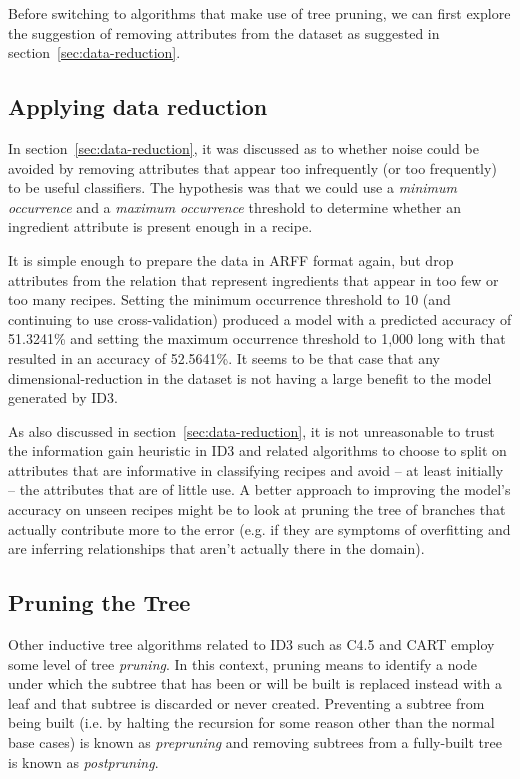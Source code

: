 \documentclass[11pt,a4paper]{article}
\begin{document}
Before switching to algorithms that make use of tree pruning, we can first explore the
suggestion of removing attributes from the dataset as suggested in
section~\ref{sec:data-reduction}.

\subsection{Applying data reduction}

In section~\ref{sec:data-reduction}, it was discussed as to whether noise could be
avoided by removing attributes that appear too infrequently (or too frequently) to be
useful classifiers. The hypothesis was that we could use a \emph{minimum occurrence} and
a \emph{maximum occurrence} threshold to determine whether an ingredient attribute
is present enough in a recipe.

It is simple enough to prepare the data in ARFF format again, but drop attributes from
the relation that represent ingredients that appear in too few or too many recipes.
Setting the minimum occurrence threshold to 10 (and continuing to use cross-validation)
produced a model with a predicted accuracy of 51.3241\% and setting the maximum
occurrence threshold to 1,000 long with that resulted in an accuracy of 52.5641\%. It
seems to be that case that any dimensional-reduction in the dataset is not having a
large benefit to the model generated by ID3.

As also discussed in section~\ref{sec:data-reduction}, it is not unreasonable
to trust the information gain heuristic in ID3 and related algorithms to choose
to split on attributes that are informative in classifying recipes and avoid
-- at least initially -- the attributes that are of little use. A better
approach to improving the model's accuracy on unseen recipes might be
to look at pruning the tree of branches that actually contribute more to the error
(e.g. if they are symptoms of overfitting and are inferring relationships that
aren't actually there in the domain).

\subsection{Pruning the Tree}

Other inductive tree algorithms related to ID3 such as C4.5 and CART employ some
level of tree \emph{pruning}. In this context, pruning means to identify a node
under which the subtree that has been or will be built is replaced instead with
a leaf and that subtree is discarded or never created. Preventing a subtree
from being built (i.e. by halting the recursion for some reason other than 
the normal base cases) is known as \emph{prepruning} and removing subtrees from
a fully-built tree is known as \emph{postpruning}.
\end{document}
